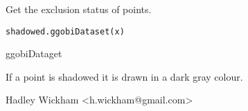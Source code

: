 \begin{Description}\relax
Get the exclusion status of points.
\end{Description}
\begin{Usage}
\begin{verbatim}shadowed.ggobiDataset(x)\end{verbatim}
\end{Usage}
\begin{Arguments}
\begin{ldescription}
\item[\code{x}] ggobiDataget
\end{ldescription}
\end{Arguments}
\begin{Details}\relax
If a point is shadowed it is drawn in a dark gray colour.
\end{Details}
\begin{Author}\relax
Hadley Wickham <h.wickham@gmail.com>
\end{Author}
\begin{SeeAlso}\relax
{}
\end{SeeAlso}
\begin{Examples}
\begin{ExampleCode}\end{ExampleCode}
\end{Examples}

